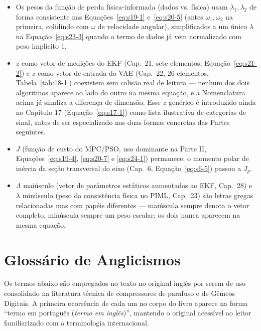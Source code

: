 \documentclass[12pt,a4paper]{article}
\numberwithin{equation}{section}
\numberwithin{table}{section}
\numberwithin{figure}{section}
\begin{document}
{\begin{itemize}
	\item Os pesos da função de perda física-informada (dados vs. física) usam $\lambda_1, \lambda_2$ de forma consistente nas Equações~\eqref{eq:s19-1} e~\eqref{eq:s20-5} (antes $\omega_1,\omega_2$ na primeira, colidindo com $\omega$ de velocidade angular), simplificados a um único $\lambda$ na Equação~\eqref{eq:s23-3} quando o termo de dados já vem normalizado com peso implícito 1.
	\item $z$ como vetor de medições do EKF (Cap.~21, sete elementos, Equação~\eqref{eq:s21-2}) e $z$ como vetor de entrada do VAE (Cap.~22, 26 elementos, Tabela~\ref{tab:18-1}) coexistem sem colisão real de leitura — nenhum dos dois algoritmos aparece ao lado do outro na mesma equação, e a Nomenclatura acima já sinaliza a diferença de dimensão. Esse $z$ genérico é introduzido ainda no Capítulo 17 (Equação~\eqref{eq:s17-1}) como lista ilustrativa de categorias de sinal, antes de ser especializado nas duas formas concretas das Partes seguintes.
	\item $J$ (função de custo do MPC/PSO, uso dominante na Parte II, Equações~\eqref{eq:s19-4}, \eqref{eq:s20-7} e \eqref{eq:s24-1}) permanece; o momento polar de inércia da seção transversal do eixo (Cap.~6, Equação~\eqref{eq:s6-5}) passou a $J_p$.
	\item $\Lambda$ maiúsculo (vetor de parâmetros estáticos aumentados ao EKF, Cap.~28) e $\lambda$ minúsculo (peso da consistência física no PIML, Cap.~23) são letras gregas relacionadas mas com papéis diferentes — maiúscula sempre denota o vetor completo, minúscula sempre um peso escalar; os dois nunca aparecem na mesma equação.
\end{itemize}

\clearpage

\clearpage



\clearpage
\section*{Glossário de Anglicismos}

Os termos abaixo são empregados no texto no original inglês por serem de uso consolidado na literatura técnica de compressores de parafuso e de Gêmeos Digitais. A primeira ocorrência de cada um no corpo do livro aparece na forma ``termo em português (\textit{termo em inglês})'', mantendo o original acessível ao leitor familiarizado com a terminologia internacional.

}
\end{document}

